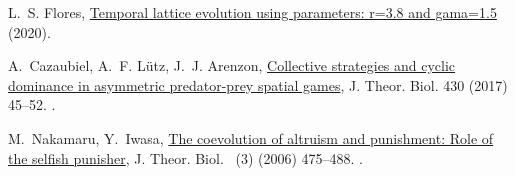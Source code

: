\documentclass[5p]{elsarticle}
\begin{document}
\begin{thebibliography}{10}
L.~S. Flores, \href{https://doi.org/10.6084/m9.figshare.13366580.v1}{Temporal
  lattice evolution using parameters: r=3.8 and gama=1.5} (2020).

A.~Cazaubiel, A.~F. L{\"{u}}tz, J.~J. Arenzon,
  \href{http://dx.doi.org/10.1016/j.jtbi.2017.07.002
  https://linkinghub.elsevier.com/retrieve/pii/S0022519317303272}{{Collective
  strategies and cyclic dominance in asymmetric predator-prey spatial games}},
  J. Theor. Biol. 430 (2017) 45--52.
\newblock \href {https://doi.org/10.1016/j.jtbi.2017.07.002}
  {}.

M.~Nakamaru, Y.~Iwasa,
  \href{https://www.sciencedirect.com/science/article/pii/S0022519305004509}{The
  coevolution of altruism and punishment: Role of the selfish punisher},
 J. Theor. Biol. ~(3) (2006) 475--488.
\newblock \href {https://doi.org/https://doi.org/10.1016/j.jtbi.2005.10.011}
  {}.

\end{thebibliography}
\end{document}
